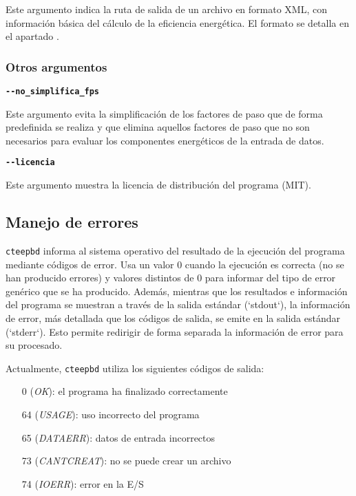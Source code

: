\documentclass[10pt,notitlepage,oneside,a4paper]{article}
\begin{document}
Este argumento indica la ruta de salida de un archivo en formato XML, con información básica del cálculo de la eficiencia energética. El formato se detalla en el apartado .

\subsubsection{Otros argumentos}

\textbf{\texttt{-{}-no\_simplifica\_fps}}

Este argumento evita la simplificación de los factores de paso que de forma predefinida se realiza y que elimina aquellos factores de paso que no son necesarios para evaluar los componentes energéticos de la entrada de datos.

\textbf{\texttt{-{}-licencia}}

Este argumento muestra la licencia de distribución del programa (MIT).


\subsection{Manejo de errores}

\texttt{cteepbd} informa al sistema operativo del resultado de la ejecución del programa mediante códigos de error. Usa un valor 0 cuando la ejecución es correcta (no se han producido errores) y valores distintos de 0 para informar del tipo de error genérico que se ha producido. Además, mientras que los resultados e información del programa se muestran a través de la salida estándar (`stdout`), la información de error, más detallada que los códigos de salida, se emite en la salida estándar (`stderr`). Esto permite redirigir de forma separada la información de error para su procesado.

Actualmente, \texttt{cteepbd} utiliza los siguientes códigos de salida:

\begin{itemize}
\item[0] (\textit{OK}): el programa ha finalizado correctamente
\item[64] (\textit{USAGE}): uso incorrecto del programa
\item[65] (\textit{DATAERR}): datos de entrada incorrectos
\item[73] (\textit{CANTCREAT}): no se puede crear un archivo
\item[74] (\textit{IOERR}): error en la E/S
\end{itemize}
\end{document}

